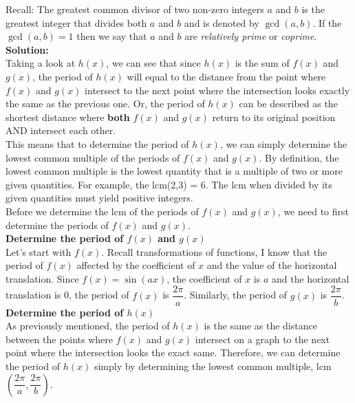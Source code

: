 \documentclass[12pt]{book}
\begin{document}
\begin{enumerate}
\vspace{0.2cm}
Recall: The greatest common divisor of two non-zero integers $a$ and $b$ is the greatest integer that divides both $a$ and $b$ and is denoted by $\gcd(a,b)$. If the $\gcd(a,b)=1$ then we say that $a$ and $b$ are \emph{relatively prime} or \emph{coprime}.\\

\textbf{Solution:}\\
Taking a look at $h(x)$, we can see that since $h(x)$ is the sum of $f(x)$ and $g(x)$, the period of $h(x)$ will equal to the distance from the point where $f(x)$ and $g(x)$ intersect to the next point where the intersection looks exactly the same as the previous one.
Or, the period of $h(x)$ can be described as the shortest distance where \textbf{both} $f(x)$ and $g(x)$ return to its original position AND intersect each other.\\

This means that to determine the period of $h(x)$, we can simply determine the lowest common multiple of the periods of $f(x)$ and $g(x)$. By definition, the lowest common multiple is the lowest quantity that is a multiple of two or more given quantities. For example, the lcm(2,3) = 6. The lcm when divided by its given quantities must yield positive integers.\\

Before we determine the lcm of the periods of $f(x)$ and $g(x)$, we need to first determine the periods of $f(x)$ and $g(x)$.\\

\textbf{Determine the period of $f(x)$ and $g(x)$}\\
Let's start with $f(x)$. Recall transformations of functions, I know that the period of $f(x)$ affected by the coefficient of $x$ and the value of the horizontal translation. Since $f(x) = \sin(ax)$, the coefficient of $x$ is $a$ and the horizontal translation is 0, the period of $f(x)$ is $\dfrac{2\pi}{a}$. Similarly, the period of $g(x)$ is $\dfrac{2\pi}{b}$.\\

\textbf{Determine the period of $h(x)$}\\
As previously mentioned, the period of $h(x)$ is the same as the distance between the points where $f(x)$ and $g(x)$ intersect on a graph to the next point where the intersection looks the exact same. Therefore, we can determine the period of $h(x)$ simply by determining the lowest common multiple, lcm $\left(\dfrac{2\pi}{a}, \dfrac{2\pi}{b} \right)$.


\end{enumerate}
\end{document}
